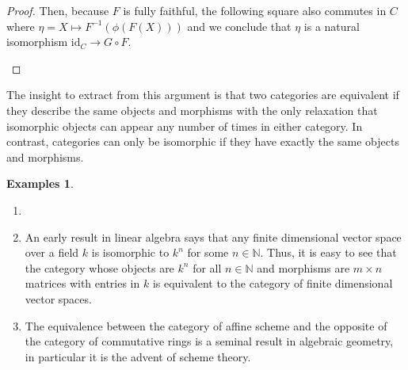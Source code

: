 \documentclass{article}
\theoremstyle{definition}
\newtheorem{exmps}[thm]{Examples}
\theoremstyle{remark}
\newcommand{\N}{\mathbb{N}}
\newcommand{\id}{\text{id}}
\begin{document}
\begin{proof}
	Then, because $F$ is fully faithful, the following square also commutes in $C$ where $\eta = X \mapsto F^{-1}(\phi(F(X)))$ and we conclude that $\eta$ is a natural isomorphism $\id_C \rightarrow G\circ F$.
	\begin{figure}[H]
		\centering
	\end{figure}
\end{proof}
The insight to extract from this argument is that two categories are equivalent if they describe the same objects and morphisms with the only relaxation that isomorphic objects can appear any number of times in either category. In contrast, categories can only be isomorphic if they have exactly the same objects and morphisms.
\begin{exmps}
	\begin{enumerate}
		\item[]
		\item An early result in linear algebra says that any finite dimensional vector space over a field $k$ is isomorphic to $k^n$ for some $n\in \N$. Thus, it is easy to see that the category whose objects are $k^n$ for all $n\in \N$ and morphisms are $m\times n$ matrices with entries in $k$ is equivalent to the category of finite dimensional vector spaces.
		\item The equivalence between the category of affine scheme and the opposite of the category of commutative rings is a seminal result in algebraic geometry, in particular it is the advent of scheme theory.
	\end{enumerate}
\end{exmps}
\end{document}
